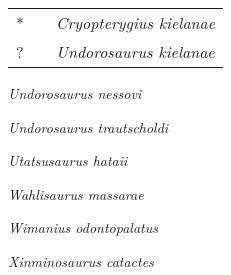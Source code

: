 \begin{tabularx}{42em}{llX}
* & \cite*{Tyborowski2016APP} & \emph{Cryopterygius kielanae} \citeauthor*{Tyborowski2016APP} \\
? & \cite*{Zverkov2019JSP} & \emph{Undorosaurus kielanae} \citeauthor*{Tyborowski2016APP} \\
\end{tabularx}

\emph{Undorosaurus nessovi} \cite{Efimov1999PZa}

\emph{Undorosaurus trautscholdi} \cite{Arkhangelsky2014PZIR}

\emph{Utatsusaurus hataii} \cite{Shikama1978SRTUGa}

\emph{Wahlisaurus massarae} \cite{Lomax2016JSP}

\emph{Wimanius odontopalatus} \cite{Maisch1998NJGPM}

\emph{Xinminosaurus catactes} \cite{Jiang2008PNS}

